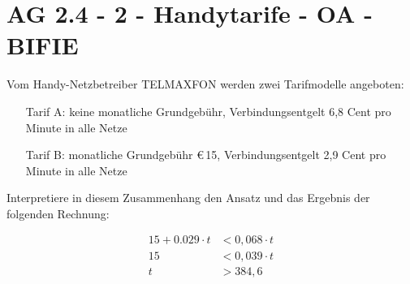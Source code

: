 \section{AG 2.4 - 2 - Handytarife  - OA - BIFIE}

\begin{beispiel}[AG 2.4]{1} %
Vom Handy-Netzbetreiber TELMAXFON werden zwei Tarifmodelle angeboten: \\
\begin{itemize}
	\item[Tarif A:] keine monatliche Grundgebühr,
 Verbindungsentgelt 6,8 Cent pro Minute in alle Netze
\item[Tarif B:] monatliche Grundgebühr \euro\,15,
 Verbindungsentgelt 2,9 Cent pro Minute in alle Netze
\end{itemize}

Interpretiere in diesem Zusammenhang den Ansatz und das Ergebnis der folgenden Rechnung:

\begin{align*}
15 + 0.029\cdot t &< 0,068\cdot t \\
15 &< 0,039\cdot t \\
t&>384,6
\end{align*}

\end{beispiel}